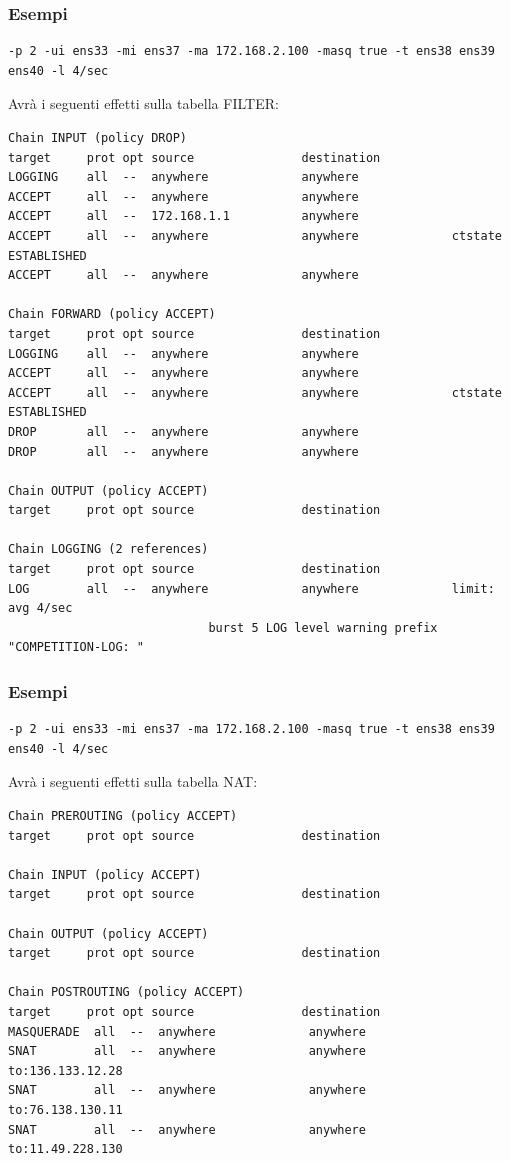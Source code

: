 \documentclass{beamer}
\begin{document}
\begin{frame}[fragile]
    \frametitle{Esempi}
    \begin{lstlisting}
-p 2 -ui ens33 -mi ens37 -ma 172.168.2.100 -masq true -t ens38 ens39 ens40 -l 4/sec
    \end{lstlisting}
    Avrà i seguenti effetti sulla tabella FILTER:
    \begin{lstlisting}
Chain INPUT (policy DROP)
target     prot opt source               destination         
LOGGING    all  --  anywhere             anywhere            
ACCEPT     all  --  anywhere             anywhere            
ACCEPT     all  --  172.168.1.1          anywhere            
ACCEPT     all  --  anywhere             anywhere             ctstate ESTABLISHED
ACCEPT     all  --  anywhere             anywhere            

Chain FORWARD (policy ACCEPT)
target     prot opt source               destination         
LOGGING    all  --  anywhere             anywhere            
ACCEPT     all  --  anywhere             anywhere            
ACCEPT     all  --  anywhere             anywhere             ctstate ESTABLISHED
DROP       all  --  anywhere             anywhere            
DROP       all  --  anywhere             anywhere            

Chain OUTPUT (policy ACCEPT)
target     prot opt source               destination         

Chain LOGGING (2 references)
target     prot opt source               destination         
LOG        all  --  anywhere             anywhere             limit: avg 4/sec 
                            burst 5 LOG level warning prefix "COMPETITION-LOG: "
    \end{lstlisting}
\end{frame}

\begin{frame}[fragile]
    \frametitle{Esempi}
    \begin{lstlisting}
-p 2 -ui ens33 -mi ens37 -ma 172.168.2.100 -masq true -t ens38 ens39 ens40 -l 4/sec
    \end{lstlisting}
    Avrà i seguenti effetti sulla tabella NAT:
    \begin{lstlisting}
Chain PREROUTING (policy ACCEPT)
target     prot opt source               destination         

Chain INPUT (policy ACCEPT)
target     prot opt source               destination         

Chain OUTPUT (policy ACCEPT)
target     prot opt source               destination         

Chain POSTROUTING (policy ACCEPT)
target     prot opt source               destination         
MASQUERADE  all  --  anywhere             anywhere            
SNAT        all  --  anywhere             anywhere             to:136.133.12.28
SNAT        all  --  anywhere             anywhere             to:76.138.130.11
SNAT        all  --  anywhere             anywhere             to:11.49.228.130
    \end{lstlisting}
\end{frame}
\end{document}
